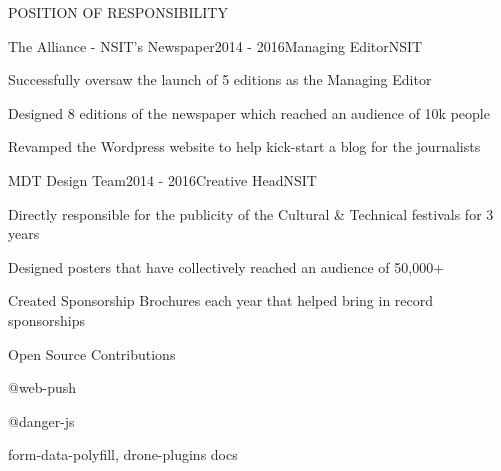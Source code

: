 \documentclass{resume} %
\begin{document}
\begin{rSection}{POSITION OF RESPONSIBILITY}

\begin{rSubsection}{The Alliance - NSIT's Newspaper}{2014 - 2016}{Managing Editor}{NSIT}
\item Successfully oversaw the launch of 5 editions as the Managing Editor
\item Designed 8 editions of the newspaper which reached an audience of 10k people
\item Revamped the Wordpress website to help kick-start a blog for the journalists
\end{rSubsection}


\begin{rSubsection}{MDT Design Team}{2014 - 2016}{Creative Head}{NSIT}
\item Directly responsible for the publicity of the Cultural & Technical festivals for 3 years
\item Designed posters that have collectively reached an audience of 50,000+
\item Created Sponsorship Brochures each year that helped bring in record sponsorships
\end{rSubsection}

\end{rSection}



\begin{rSection}{Open Source Contributions}
\item @web-push
\item @danger-js
\item form-data-polyfill, drone-plugins docs
\end{rSection}
\end{document}
